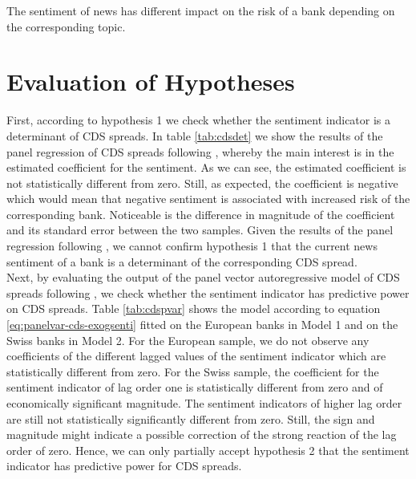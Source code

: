 \begin{hyp}
	The sentiment of news has different impact on the risk of a bank depending on the corresponding topic.
\end{hyp}


\section{Evaluation of Hypotheses} \label{sec:results}

First, according to hypothesis 1 we check whether the sentiment indicator is a determinant of CDS spreads. In table \ref{tab:cdsdet} we show the results of the panel regression of CDS spreads following \cite{annaert2013}, whereby the main interest is in the estimated coefficient for the sentiment. As we can see, the estimated coefficient is not statistically different from zero. Still, as expected, the coefficient is negative which would mean that negative sentiment is associated with increased risk of the corresponding bank. Noticeable is the difference in magnitude of the coefficient and its standard error between the two samples. Given the results of the panel regression following \cite{annaert2013}, we cannot confirm hypothesis 1 that the current news sentiment of a bank is a determinant of the corresponding CDS spread. \\



Next, by evaluating the output of the panel vector autoregressive model of CDS spreads following \cite{cathcart2020}, we check whether the sentiment indicator has predictive power on CDS spreads. Table \ref{tab:cdspvar} shows the model according to equation \ref{eq:panelvar-cds-exogsenti} fitted on the European banks in Model 1 and on the Swiss banks in Model 2. For the European sample, we do not observe any coefficients of the different lagged values of the sentiment indicator which are statistically different from zero. For the Swiss sample, the coefficient for the sentiment indicator of lag order one is statistically different from zero and of economically significant magnitude. The sentiment indicators of higher lag order are still not statistically significantly different from zero. Still, the sign and magnitude might indicate a possible correction of the strong reaction of the lag order of zero. Hence, we can only partially accept hypothesis 2 that the sentiment indicator has predictive power for CDS spreads. \\

